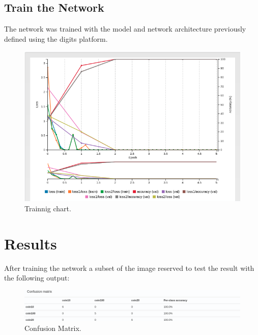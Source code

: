 \documentclass[10pt,journal,compsoc]{IEEEtran}
\begin{document}
\subsection{Train the Network}

The network was trained with the model and network architecture previously defined using the digits platform.

\begin{figure}[h]
\centering
\includegraphics[scale=0.3]{trainning-chart}
\caption{Trainnig chart.}
\label{fig:figure3}
\end{figure}



\section{Results}


After training the network a subset of the image reserved to test the result with the following output:

\begin{figure}[h]
\centering
\includegraphics[scale=0.2]{confusion-matrix}
\caption{Confusion Matrix.}
\label{fig:figure4}
\end{figure}
\end{document}
